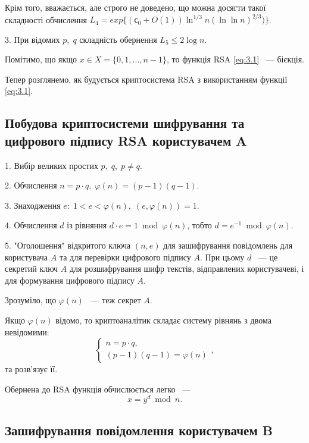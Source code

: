 Крім того, вважається, але строго не доведено, що можна досягти такої складності обчислення $L_{4} = exp\{ (  \mbox{с}_{0} + O(1)) \ln ^{1/3} n (\ln\ln n) ^ {2/3}) \}$.

\par3. При відомих $p,\;q$ складність обернення $L_{5} \leq 2 \log n$.

Помітимо, що якщо $x \in X = \{ 0, 1, ..., n-1 \}$, то функція RSA \eqref{eq:3.1} ~--- бієкція.

Тепер розглянемо, як будується криптосистема RSA з використанням функції \eqref{eq:3.1}.

\subsection{Побудова криптосистеми шифрування та цифрового підпису RSA користувачем A}

\par1. Вибір великих простих $p,\; q,\; p \neq q$.

\par2. Обчислення $n = p \cdot q, \; \varphi(n)=(p-1)(q-1)$.

\par3. Знаходження $e:\;1<e<\varphi(n),\;(e,\varphi(n))=1$.

\par4. Обчислення $d$ із рівняння $d \cdot e = 1 \bmod \varphi(n)$, тобто $d = e ^{-1} \bmod \varphi(n)$.

\par5. "Оголошення" відкритого ключа $(n,e)$ для зашифрування повідомлень для користувача $A$ та для перевірки цифрового підпису $A$.
При цьому $d$ ~--- це секретий ключ $A$ для розшифрування шифр текстів, відправлених користувачеві, і для формування цифрового підпису $A$.

Зрозуміло, що $\varphi (n)$ ~--- теж секрет $A$.

Якщо $\varphi (n)$ відомо, то криптоаналітик складає систему рівнянь з двома невідомими:
\begin{equation*}
\begin{cases}
    n = p \cdot q, \\
    (p-1)(q-1) = \varphi (n)
\end{cases},
\end{equation*}
та розв'язує її.

Обернена до RSA функція обчислюється легко ~---
\begin{equation} 
x = y ^{d} \bmod n.
\end{equation}

\subsection{Зашифрування повідомлення користувачем B}

